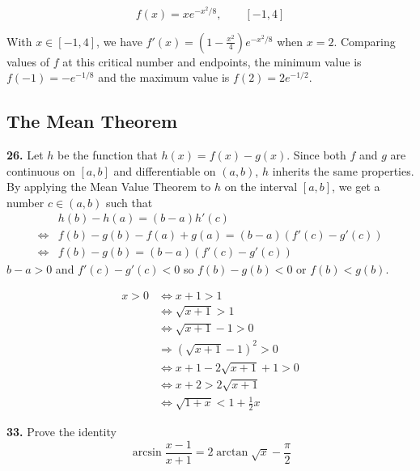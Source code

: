 \documentclass[a4paper,12pt]{article}
\begin{document}
\[f(x) = xe^{-x^2/8}, \qquad [-1, 4]\tag{59}\]

With $x \in [-1, 4]$, we have $f'(x) =  \left(1-\frac{x^2}{4}\right)e^{-x^2/8}$
when $x = 2$. Comparing values of $f$ at this critical number and endpoints,
the minimum value is $f(-1) = -e^{-1/8}$ and
the maximum value is $f(2) = 2e^{-1/2}$.

\subsection{The Mean Theorem}
\textbf{26. }Let $h$ be the function that $h(x) = f(x) - g(x)$. Since both $f$
and $g$ are continuous on $[a, b]$ and differentiable on $(a, b)$, $h$ inherits
the same properties. By applying the Mean Value Theorem to $h$ on the interval
$[a, b]$, we get a number $c \in (a, b)$ such that
\begin{align*}
    &h(b) - h(a) = (b - a)h'(c)\\
\iff&f(b) - g(b) - f(a) + g(a) = (b - a)(f'(c) - g'(c))\\
\iff&f(b) - g(b) = (b - a)(f'(c) - g'(c))
\end{align*}
$b - a > 0$ and $f'(c) - g'(c) < 0$ so $f(b) - g(b) < 0$ or $f(b) < g(b)$.

\begin{align*}
x > 0 &\iff x + 1 > 1\\
      &\iff \sqrt{x + 1} > 1\\
      &\iff \sqrt{x + 1} - 1 > 0\\
      &\Longrightarrow \left(\sqrt{x + 1} - 1\right)^2 > 0\\
      &\iff x + 1 - 2\sqrt{x + 1} + 1 > 0\\
      &\iff x + 2 > 2\sqrt{x + 1}\\
      &\iff \sqrt{1 + x} < 1 + \frac{1}{2}x\tag{27}
\end{align*}

\noindent\textbf{33. }Prove the identity
\[\arcsin\frac{x - 1}{x + 1} = 2\arctan\sqrt{x} - \frac{\pi}{2}\]
\end{document}

